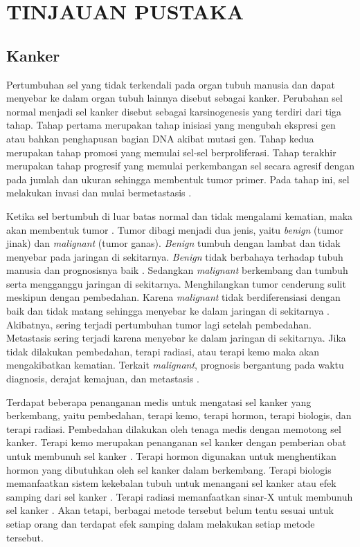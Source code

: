 \chapter{TINJAUAN PUSTAKA}

\section{Kanker}
    Pertumbuhan sel yang tidak terkendali pada organ tubuh manusia dan dapat menyebar ke dalam organ tubuh lainnya disebut sebagai kanker. Perubahan sel normal menjadi sel kanker disebut sebagai karsinogenesis yang terdiri dari tiga tahap. Tahap pertama merupakan tahap inisiasi yang mengubah ekspresi gen atau bahkan penghapusan bagian DNA akibat mutasi gen. Tahap kedua merupakan tahap promosi yang memulai sel-sel berproliferasi. Tahap terakhir merupakan tahap progresif yang memulai perkembangan sel secara agresif dengan pada jumlah dan ukuran sehingga membentuk tumor primer. Pada tahap ini, sel melakukan invasi dan mulai bermetastasis \citep{Baranwal2021}.

    Ketika sel bertumbuh di luar batas normal dan tidak mengalami kematian, maka akan membentuk tumor \citep{Shedden-Mora2020}. Tumor dibagi menjadi dua jenis, yaitu \textit{benign} (tumor jinak) dan \textit{malignant} (tumor ganas). \textit{Benign} tumbuh dengan lambat dan tidak menyebar pada jaringan di sekitarnya. \textit{Benign} tidak berbahaya terhadap tubuh manusia dan prognosisnya baik \citep{Wu2021b}. Sedangkan \textit{malignant} berkembang dan tumbuh serta mengganggu jaringan di sekitarnya. Menghilangkan tumor cenderung sulit meskipun dengan pembedahan. Karena \textit{malignant} tidak berdiferensiasi dengan baik dan tidak matang sehingga menyebar ke dalam jaringan di sekitarnya \citep{li2022epidemiology}. Akibatnya, sering terjadi pertumbuhan tumor lagi setelah pembedahan. Metastasis sering terjadi karena menyebar ke dalam jaringan di sekitarnya. Jika tidak dilakukan pembedahan, terapi radiasi, atau terapi kemo maka akan mengakibatkan kematian. Terkait \textit{malignant}, prognosis bergantung pada waktu diagnosis, derajat kemajuan, dan metastasis \citep{Park2022}.

    Terdapat beberapa penanganan medis untuk mengatasi sel kanker yang berkembang, yaitu pembedahan, terapi kemo, terapi hormon, terapi biologis, dan terapi radiasi. Pembedahan dilakukan oleh tenaga medis dengan memotong sel kanker. Terapi kemo merupakan penanganan sel kanker dengan pemberian obat untuk membunuh sel kanker \citep{Strobel2019}. Terapi hormon digunakan untuk menghentikan hormon yang dibutuhkan oleh sel kanker dalam berkembang. Terapi biologis memanfaatkan sistem kekebalan tubuh untuk menangani sel kanker atau efek samping dari sel kanker \citep{Waks2019}. Terapi radiasi memanfaatkan sinar-X untuk membunuh sel kanker \citep{Wu2021}. Akan tetapi, berbagai metode tersebut belum tentu sesuai untuk setiap orang dan terdapat efek samping dalam melakukan setiap metode tersebut.

